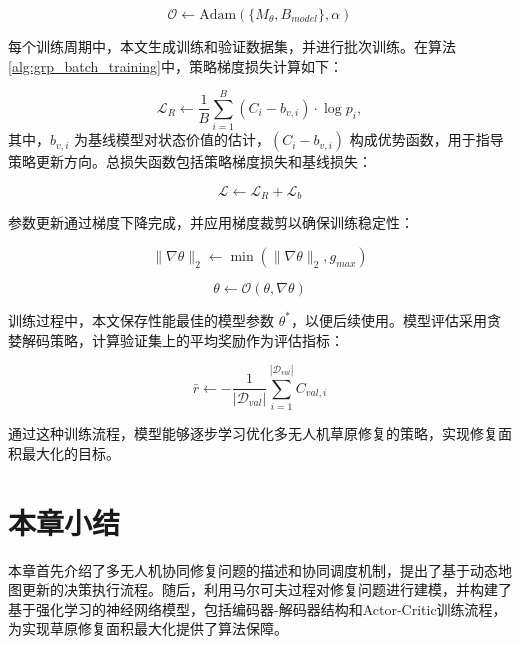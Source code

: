 \begin{equation}
	\mathcal{O} \leftarrow \text{Adam}(\{M_{\theta}, B_{model}\}, \alpha)
\end{equation}

每个训练周期中，本文生成训练和验证数据集，并进行批次训练。在算法\ref{alg:grp_batch_training}中，策略梯度损失计算如下：

\begin{equation}
	\mathcal{L}_{R} \leftarrow \frac{1}{B}\sum_{i=1}^{B}(C_i - b_{v,i}) \cdot \log p_i,
\end{equation}
其中，$b_{v,i}$ 为基线模型对状态价值的估计，$(C_i - b_{v,i})$ 构成优势函数，用于指导策略更新方向。总损失函数包括策略梯度损失和基线损失：

\begin{equation}
	\mathcal{L} \leftarrow \mathcal{L}_{R} + \mathcal{L}_{b}
\end{equation}

参数更新通过梯度下降完成，并应用梯度裁剪以确保训练稳定性：

\begin{equation}
	\|\nabla\theta\|_2 \leftarrow \min(\|\nabla\theta\|_2, g_{max})
\end{equation}

\begin{equation}
	\theta \leftarrow \mathcal{O}(\theta, \nabla\theta)
\end{equation}

训练过程中，本文保存性能最佳的模型参数 $\theta^*$，以便后续使用。模型评估采用贪婪解码策略，计算验证集上的平均奖励作为评估指标：

\begin{equation}
	\bar{r} \leftarrow -\frac{1}{|\mathcal{D}_{val}|}\sum_{i=1}^{|\mathcal{D}_{val}|} C_{val,i}
\end{equation}

通过这种训练流程，模型能够逐步学习优化多无人机草原修复的策略，实现修复面积最大化的目标。

\section{本章小结}
本章首先介绍了多无人机协同修复问题的描述和协同调度机制，提出了基于动态地图更新的决策执行流程。随后，利用马尔可夫过程对修复问题进行建模，并构建了基于强化学习的神经网络模型，包括编码器-解码器结构和Actor-Critic训练流程，为实现草原修复面积最大化提供了算法保障。